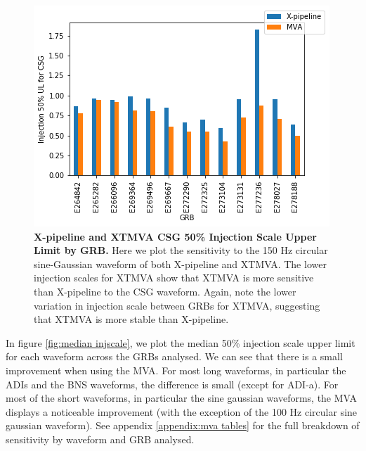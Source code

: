 \documentclass[11pt]{cuthesis}
\newcommand{\xp}{X-pipeline }
\newcommand{\xpfs}{X-pipeline. }
\begin{document}
\begin{figure} %
\begin{center}
\includegraphics[width=1.0\linewidth]{csg_injscale_comparison.png}
\end{center}
\caption{\textbf{\xp and XTMVA  CSG 50\% Injection Scale Upper Limit by GRB.} Here we plot the sensitivity to the 150 Hz circular sine-Gaussian waveform of both \xp and XTMVA. The lower injection scales for XTMVA show that XTMVA is more sensitive than \xp to the CSG waveform. Again, note the lower variation in injection scale between GRBs for XTMVA, suggesting that XTMVA is more stable than \xpfs }
\label{fig:csg comparison}
\end{figure}

In figure \ref{fig:median injscale}, we plot the median 50\% injection scale upper limit for each waveform across the GRBs analysed. We can see that there is a small improvement when using the MVA. For most long waveforms, in particular the ADIs and the BNS waveforms, the difference is small (except for ADI-a). For most of the short waveforms, in particular the sine gaussian waveforms, the MVA displays a noticeable improvement (with the exception of the 100 Hz circular sine gaussian waveform). See appendix \ref{appendix:mva tables} for the full breakdown of sensitivity by waveform and GRB analysed.
\end{document}
